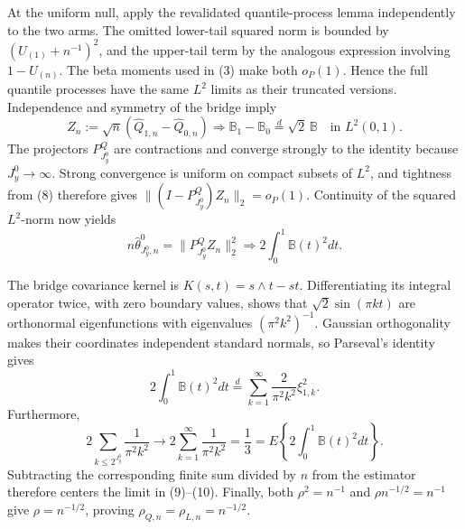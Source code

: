 At the uniform null, apply the revalidated quantile-process lemma independently to the two arms.  The omitted lower-tail squared norm is bounded by \((U_{(1)}+n^{-1})^2\), and the upper-tail term by the analogous expression involving \(1-U_{(n)}\).  The beta moments used in (3) make both \(o_P(1)\).  Hence the full quantile processes have the same \(L^2\) limits as their truncated versions.  Independence and symmetry of the bridge imply
\[
Z_n:=\sqrt n(\widehat Q_{1,n}-\widehat Q_{0,n})
\Rightarrow\mathbb B_1-\mathbb B_0\stackrel d=\sqrt2\,\mathbb B
\quad\text{in }L^2(0,1).                                                  \tag{8}
\]
The projectors \(P^Q_{J_y^0}\) are contractions and converge strongly to the identity because \(J_y^0\to\infty\).  Strong convergence is uniform on compact subsets of \(L^2\), and tightness from (8) therefore gives \(\|(I-P^Q_{J_y^0})Z_n\|_2=o_P(1)\).  Continuity of the squared \(L^2\)-norm now yields
\[
n\widehat\theta^0_{J_y^0,n}
=\|P^Q_{J_y^0}Z_n\|_2^2
\Rightarrow2\int_0^1\mathbb B(t)^2dt.                                   \tag{9}
\]

The bridge covariance kernel is \(K(s,t)=s\wedge t-st\).  Differentiating its integral operator twice, with zero boundary values, shows that \(\sqrt2\sin(\pi kt)\) are orthonormal eigenfunctions with eigenvalues \((\pi^2k^2)^{-1}\).  Gaussian orthogonality makes their coordinates independent standard normals, so Parseval's identity gives
\[
2\int_0^1\mathbb B(t)^2dt
\stackrel d=\sum_{k=1}^\infty\frac{2}{\pi^2k^2}\xi_{1,k}^2.               \tag{10}
\]
Furthermore,
\[
2\sum_{k\le2^{J_y^0}}\frac1{\pi^2k^2}\longrightarrow
2\sum_{k=1}^\infty\frac1{\pi^2k^2}=\frac13
=E\left\{2\int_0^1\mathbb B(t)^2dt\right\}.
\]
Subtracting the corresponding finite sum divided by \(n\) from the estimator therefore centers the limit in (9)--(10).  Finally, both \(\rho^2=n^{-1}\) and \(\rho n^{-1/2}=n^{-1}\) give \(\rho=n^{-1/2}\), proving \(\rho_{Q,n}=\rho_{L,n}=n^{-1/2}\).